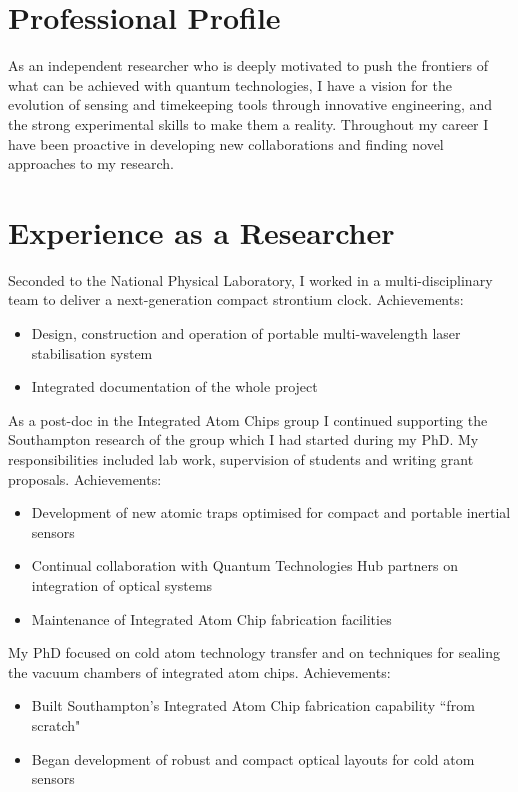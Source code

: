 \documentclass[11pt,a4paper,sans]{moderncv}        %
\begin{document}
\makecvtitle
\vspace{-1.5cm}
\section{Professional Profile}
As an independent researcher who is deeply motivated to push the frontiers of what can be achieved with quantum technologies, I have a vision for the evolution of sensing and timekeeping tools through innovative engineering, and the strong experimental skills to make them a reality. Throughout my career I have been proactive in developing new collaborations and finding novel approaches to my research.

\section{Experience as a Researcher}
{Seconded to the National Physical Laboratory, I worked in a multi-disciplinary team to deliver a next-generation compact strontium clock.
Achievements:
\begin{itemize}[leftmargin=1cm]
	\item Design, construction and operation of portable multi-wavelength laser stabilisation system
	\item Integrated documentation of the whole project
\end{itemize}
}  %

{As a post-doc in the Integrated Atom Chips group I continued supporting the Southampton research of the group which I had started during my PhD. My responsibilities included lab work, supervision of students and writing grant proposals.
Achievements:
\begin{itemize}[leftmargin=1cm]
	\item Development of new atomic traps optimised for compact and portable inertial sensors
	\item Continual collaboration with Quantum Technologies Hub partners on integration of optical systems
	\item Maintenance of Integrated Atom Chip fabrication facilities
\end{itemize}
} 

{My PhD focused on cold atom technology transfer and on techniques for sealing the vacuum chambers of integrated atom chips.
Achievements:
\begin{itemize}[leftmargin=1cm]
	\item Built Southampton's Integrated Atom Chip fabrication capability ``from scratch"
	\item Began development of robust and compact optical layouts for cold atom sensors
\end{itemize}
}
\end{document}
